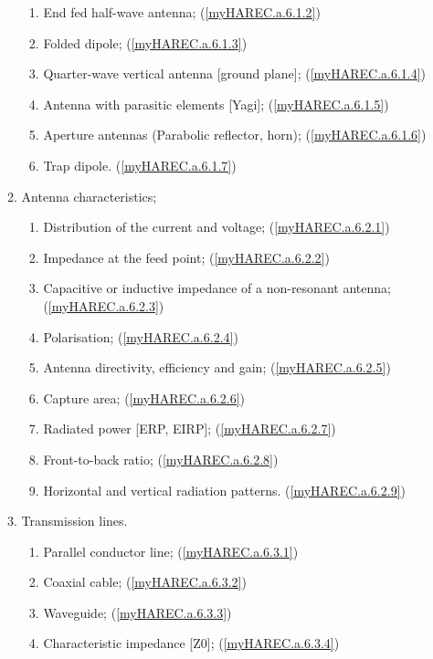 \begin{enumerate}
\begin{enumerate}[noitemsep]
\begin{enumerate}[noitemsep]
\item End fed half-wave antenna; (\ref{myHAREC.a.6.1.2})\label{HAREC.a.6.1.2}
\item Folded dipole; (\ref{myHAREC.a.6.1.3})\label{HAREC.a.6.1.3}
\item Quarter-wave vertical antenna [ground plane]; (\ref{myHAREC.a.6.1.4})\label{HAREC.a.6.1.4}
\item Antenna with parasitic elements [Yagi]; (\ref{myHAREC.a.6.1.5})\label{HAREC.a.6.1.5}
\item Aperture antennas (Parabolic reflector, horn); (\ref{myHAREC.a.6.1.6})\label{HAREC.a.6.1.6}
\item Trap dipole. (\ref{myHAREC.a.6.1.7})\label{HAREC.a.6.1.7}
\end{enumerate}
\item Antenna characteristics;
\begin{enumerate}[noitemsep]
\item Distribution of the current and voltage; (\ref{myHAREC.a.6.2.1})\label{HAREC.a.6.2.1}
\item Impedance at the feed point; (\ref{myHAREC.a.6.2.2})\label{HAREC.a.6.2.2}
\item Capacitive or inductive impedance of a non-resonant antenna; (\ref{myHAREC.a.6.2.3})\label{HAREC.a.6.2.3}
\item Polarisation; (\ref{myHAREC.a.6.2.4})\label{HAREC.a.6.2.4}
\item Antenna directivity, efficiency and gain; (\ref{myHAREC.a.6.2.5})\label{HAREC.a.6.2.5}
\item Capture area; (\ref{myHAREC.a.6.2.6})\label{HAREC.a.6.2.6}
\item Radiated power [ERP, EIRP]; (\ref{myHAREC.a.6.2.7})\label{HAREC.a.6.2.7}
\item Front-to-back ratio; (\ref{myHAREC.a.6.2.8})\label{HAREC.a.6.2.8}
\item Horizontal and vertical radiation patterns. (\ref{myHAREC.a.6.2.9})\label{HAREC.a.6.2.9}
\end{enumerate}
\item Transmission lines.
\begin{enumerate}[noitemsep]
\item Parallel conductor line; (\ref{myHAREC.a.6.3.1})\label{HAREC.a.6.3.1}
\item Coaxial cable; (\ref{myHAREC.a.6.3.2})\label{HAREC.a.6.3.2}
\item Waveguide; (\ref{myHAREC.a.6.3.3})\label{HAREC.a.6.3.3}
\item Characteristic impedance [Z0]; (\ref{myHAREC.a.6.3.4})\label{HAREC.a.6.3.4}

\end{enumerate}
\end{enumerate}
\end{enumerate}

